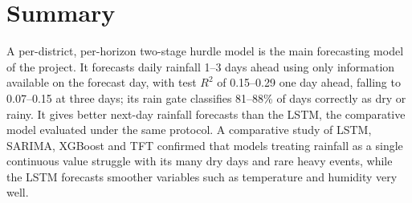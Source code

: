 \section{Summary}
A per-district, per-horizon two-stage hurdle model is the main forecasting model of the project. It forecasts daily rainfall 1--3 days ahead using only information available on the forecast day, with test $R^2$ of 0.15--0.29 one day ahead, falling to 0.07--0.15 at three days; its rain gate classifies 81--88\% of days correctly as dry or rainy. It gives better next-day rainfall forecasts than the LSTM, the comparative model evaluated under the same protocol. A comparative study of LSTM, SARIMA, XGBoost and TFT confirmed that models treating rainfall as a single continuous value struggle with its many dry days and rare heavy events, while the LSTM forecasts smoother variables such as temperature and humidity very well.
